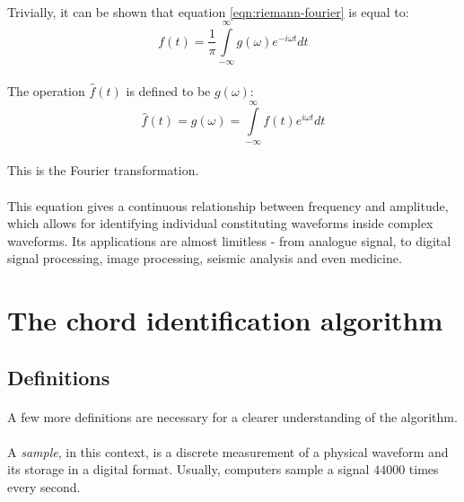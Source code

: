 \documentclass{article}
\begin{document}
\paragraph*{}
Trivially, it can be shown that equation \ref{eqn:riemann-fourier} is equal to:
$$f(t) = \frac{1}{\pi} \int\limits_{-\infty}^{\infty} g(\omega) e^{- i \omega t}
dt$$

\paragraph*{}
The operation $\hat{f}(t)$ is defined to be $g(\omega)$:
$$\hat{f}(t) = g(\omega) = \int\limits_{-\infty}^{\infty} f(t) e^{i \omega t}
dt$$

\paragraph*{}
This is the Fourier transformation.

\paragraph*{}
This equation gives a continuous relationship between frequency and amplitude,
which allows for identifying individual constituting waveforms inside complex
waveforms. Its applications are almost limitless - from analogue signal, to
digital signal processing, image processing, seismic analysis and even medicine.

\section{The chord identification algorithm}

\subsection{Definitions}

\paragraph*{}
A few more definitions are necessary for a clearer understanding of the
algorithm.

\paragraph*{}
A \textit{sample}, in this context, is a discrete measurement of a physical
waveform and its storage in a digital format. Usually, computers sample a
signal $44000$ times every second.
\end{document}
